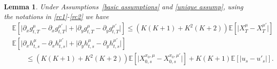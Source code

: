\documentclass[12pt]{article}
\newtheorem{lemma}[prop]{Lemma}
\theoremstyle{named}
\numberwithin{equation}{section}
\begin{document}
\begin{lemma}
    \label{lemma:unique bound}
  Under Assumptions~\ref{basic assumptions} and \ref{unique assump},
  using the notations in \eqref{rc1}-\eqref{rc2}
  we have
    \begin{align*}
        & \mathbb{E} \left[ \lvert \partial_xg^{\mu}_{t,T} - \partial_xg^{\mu'}_{t,T} \rvert + \lvert \partial_yg^{\mu}_{t,T} - \partial_yg^{\mu'}_{t,T} \rvert \right] \leq \left(K(K + 1) + K^2(K+2)\right) \mathbb{E} \left[\big| X^\mu_T - X^{\mu'}_T \big|\right] \\
        & \mathbb{E} \left[\lvert \partial_xh^{\mu}_{t,s} - \partial_xh^{\mu'}_{t,s} \rvert + \lvert \partial_yh^{\mu}_{t,s} - \partial_yh^{\mu'}_{t,s} \rvert\right] \\
        & \qquad \leq \left(K(K + 1) + K^2(K+2)\right) \mathbb{E} \left[\big| X^{x_0,\mu}_{0,s} - X^{x_0,\mu'}_{0,s} \big|\right] + K(K+1) \mathbb{E} \left[ \lvert u_{s} - u'_{s} \rvert\right].
    \end{align*}
\end{lemma}
\end{document}
